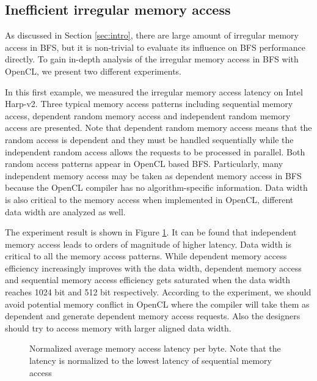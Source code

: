 \subsection{Inefficient irregular memory access}
As discussed in Section \ref{sec:intro}, there are large amount of irregular memory access in BFS, 
but it is non-trivial to evaluate its influence on BFS performance directly. To gain in-depth 
analysis of the irregular memory access in BFS with OpenCL, we present two different experiments.

In this first example, we measured the irregular memory access latency on Intel Harp-v2.
Three typical memory access patterns including sequential memory access, dependent random memory access 
and independent random memory access are presented. Note that dependent random memory access 
means that the random access is dependent and they must be handled sequentially while the independent random 
access allows the requests to be processed in parallel. Both random access patterns appear in OpenCL based BFS.
Particularly, many independent memory access may be taken as dependent memory access in BFS because the 
OpenCL compiler has no algorithm-specific information. Data width is also critical to the memory access 
when implemented in OpenCL, different data width are 
analyzed as well. 

The experiment result is shown in Figure \ref{fig:avg-mem-lat}. It can be found that independent memory 
access leads to orders of magnitude of higher latency. Data width is critical to all the memory access patterns.
While dependent memory access efficiency increasingly improves with the data width, dependent memory access and sequential memory 
access efficiency gets saturated when the data width reaches 1024 bit and 512 bit respectively. According to the experiment, 
we should avoid potential memory conflict in OpenCL where the compiler will take them as dependent and generate 
dependent memory access requests. Also the designers should try to access memory with larger aligned data width. 
\begin{figure}
    \caption{Normalized average memory access latency per byte. Note that the latency is normalized to the 
	lowest latency of sequential memory access}
\label{fig:avg-mem-lat}
\vspace{-0.5em}
\end{figure}


